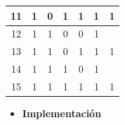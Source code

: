 \begin{center}
\begin{tabular}{ccccccc}
\multicolumn{1}{c|}{11}                          & 1                         & 0                         & 1                         & \multicolumn{1}{c|}{1}                         & \multicolumn{1}{c|}{1}                             & \multirow{-2}{*}{1}              \\ \hline
\multicolumn{1}{c|}{12}                          & 1                         & 1                         & 0                         & \multicolumn{1}{c|}{0}                         & \multicolumn{1}{c|}{1}                             &                                  \\
\multicolumn{1}{c|}{13}                          & 1                         & 1                         & 0                         & \multicolumn{1}{c|}{1}                         & \multicolumn{1}{c|}{1}                             & \multirow{-2}{*}{1}              \\ \hline
\multicolumn{1}{c|}{14}                          & 1                         & 1                         & 1                         & \multicolumn{1}{c|}{0}                         & \multicolumn{1}{c|}{1}                             &                                  \\
\multicolumn{1}{c|}{15}                          & 1                         & 1                         & 1                         & \multicolumn{1}{c|}{1}                         & \multicolumn{1}{c|}{1}                             & \multirow{-2}{*}{1}
\end{tabular}
\end{center}
\newpage
\begin{itemize}[nosep]\item\textbf{Implementación}\end{itemize}
